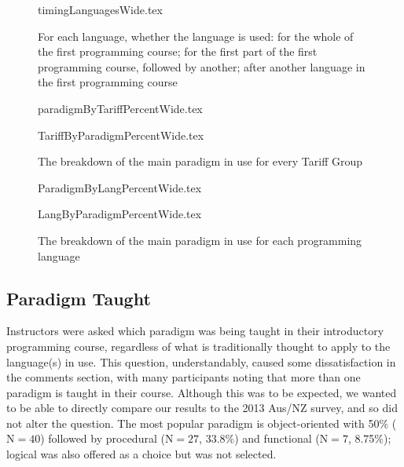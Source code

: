 \documentclass[english,submission]{programming}
\begin{document}
\begin{figure}
\begin{center}
{timingLanguagesWide.tex}
\end{center}
\caption{For each language, whether the language is used: for the whole of the first programming course; for the first part of the first programming course, followed by another; after another language in the first programming course
\label{fig:timing}}
\end{figure}




\begin{figure}
\begin{center}
{paradigmByTariffPercentWide.tex}
\end{center}
\begin{center}
{TariffByParadigmPercentWide.tex}
\end{center}
\caption{The breakdown of the main paradigm in use for every Tariff Group\label{fig:paradigmTariff}}
\end{figure}

\begin{figure}
\begin{center}
{ParadigmByLangPercentWide.tex}
\end{center}
\begin{center}
{LangByParadigmPercentWide.tex}
\end{center}
\caption{The breakdown of the main paradigm in use for each programming language\label{fig:paradigmLang}}
\end{figure}

\subsection{Paradigm Taught}

Instructors were asked which paradigm was being taught in their
introductory programming course, regardless of what is traditionally
thought to apply to the language(s) in use. This question,
understandably, caused some dissatisfaction in the comments section,
with many participants noting that more than one paradigm is taught in
their course. Although this was to be expected, we wanted to be able
to directly compare our results to the 2013 Aus/NZ survey, and so did
not alter the question. The most popular paradigm is object-oriented
with 50\% ($\mathrm{N}=40$) followed by procedural ($\mathrm{N}=27$,
33.8\%) and functional ($\mathrm{N}=7$, 8.75\%); logical was also
offered as a choice but was not selected.
\end{document}
